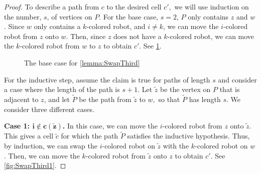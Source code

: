 \documentclass{amsart}
\newcommand{\quaad}{\quad\quad}
\newcommand{\vertex}[3][1]{
\node [circle,  fill, inner sep = 0pt,outer sep = 0pt, minimum size=#1mm] (#3) at #2 {};
}
\newcommand{\fg}[1]{
    \pgfdeclarelayer{foreground}
    \pgfsetlayers{main,foreground}
    \begin{pgfonlayer}{foreground}
    #1
    \end{pgfonlayer}
    }
\newcommand{\RedRobot}[2]{
\node [rectangle, cbred, fill, inner sep = 0pt,outer sep = 1pt, minimum size=2.3mm] (#2) at #1 {};
}
\newcommand{\GreenRobot}[2]{
\node [diamond, cbgreen, fill, inner sep = 0pt,outer sep = 1pt,minimum size=3mm] (#2) at #1 {};
}
\newcommand{\BlueRobot}[2]{
\node [isosceles triangle, shape border rotate=90,cbblue, fill, inner sep = 0pt,outer sep = 1pt,minimum size=2.5mm] (#2) at #1 {};
}
\theoremstyle{definition}
\theoremstyle{remark}
\begin{document}
\begin{proof}
    To describe a path from $c$ to the desired cell $c',$ we will use induction on the number, $s$, of vertices on $P$. For the base case, $s=2$, $P$ only contains $z$ and $w$. Since $w$ only contains a $k$-colored robot, and $i\ne k$, we can move the $i$-colored robot from $z$ onto $w$. Then, since $z$ does not have a $k$-colored robot, we can move the $k$-colored robot from $w$ to $z$ to obtain $c'$. See \cref{fig:SwapThirdBaseCase}.

    \begin{figure}[h!]
        \centering
        \quaad 
        \caption{The base case for \cref{lemma:SwapThird}}
        \label{fig:SwapThirdBaseCase}
    \end{figure}
    
    For the inductive step, assume the claim is true for paths of length $s$ and consider a case where the length of the path is $s + 1$. Let $\tilde z$ be the vertex on $P$ that is adjacent to $z$, and let $\tilde P$ be the path from $\tilde z$ to $w,$ so that $\tilde P$ has length $s$. We consider three different cases.

    \textbf{Case 1: $\boldsymbol{i\notin c(\tilde z)}$.} In this case, we can move the $i$-colored robot from $z$ onto $\tilde z$. This gives a cell $\tilde c$ for which the path $\tilde{P}$ satisfies the inductive hypothesis. Thus, by induction, we can swap the $i$-colored robot on $\tilde z$ with the $k$-colored robot on $w$. Then, we can move the $k$-colored robot from $\tilde z$ onto $z$ to obtain $c'$. See \cref{fig:SwapThird1}.
    

\end{proof}
\end{document}

